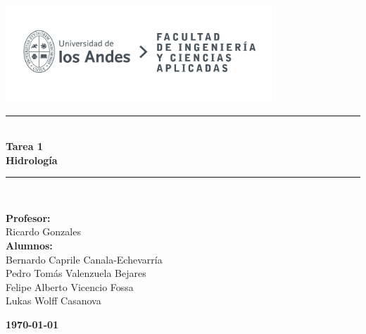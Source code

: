 \documentclass{article} %
\begin{document}
\begin{titlepage}%
\newcommand{\HRule}{\rule{\linewidth}{0.5mm}} 
\center 
\includegraphics[width=10cm]{LOGO_UNIVERSIDAD.jpg}\\ %
\vspace{3cm}
\HRule \\[0.4cm]
{ \huge \bfseries Tarea 1}\\[0.4cm] %
{ \huge \bfseries Hidrología}\\[0.4cm] %
\HRule \\[1.5cm]
 \vspace{5cm}
\begin{flushright}
    { \textbf{Profesor:}\\
    Ricardo Gonzales\\
    \vspace{0.2cm}
    \textbf{Alumnos:}\\
    Bernardo Caprile Canala-Echevarría\\
    Pedro Tomás Valenzuela Bejares\\
    Felipe Alberto Vicencio Fossa \\
    Lukas Wolff Casanova\\
    \vspace{0.2cm}

}
\end{flushright}
\vspace{1cm}
{\large \textbf{\today}}\\[2cm] %
\end{titlepage}
\end{document}
